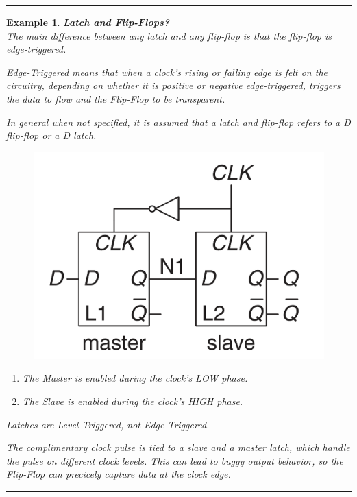 \documentclass[12pt]{article}
\newtheorem{example}{Example}
\newenvironment{examp}
{
	\vspace{.5cm}
	\hrule
\begin{example}\upshape}
	{\hrule
		\vspace{0.5cm}
\end{example}}
\begin{document}
\begin{examp}
	\textbf{Latch and Flip-Flops?}\\
	The main difference between any latch and any
	flip-flop is that the flip-flop is \textit{edge-triggered}.

	Edge-Triggered means that when a clock's rising or falling edge is felt on the circuitry, depending on whether it is positive or negative edge-triggered, triggers the data to flow and the Flip-Flop to be transparent.

	In general when
	not specified, it is assumed that a \textit{latch} and \textit{flip-flop}
	refers to a D flip-flop or a D latch.
	\begin{figure}[H]
		\centering
		\includegraphics[scale=.3]{examp082.png}
	\end{figure}
	\begin{enumerate}
		\item The Master is enabled during the clock's LOW phase.
		\item The Slave is enabled during the clock's HIGH phase.
	\end{enumerate}
	Latches are Level Triggered, not Edge-Triggered.

	The complimentary clock pulse
	is tied to a slave and a master latch, which handle the pulse on different
	clock \textit{levels}. This can lead to buggy output behavior, so the
	Flip-Flop can precicely capture data at the clock edge.


\end{examp}
\end{document}

